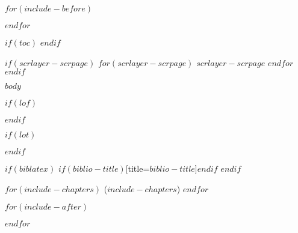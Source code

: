 \documentclass[$if(fontsize)$$fontsize$,$endif$$if(lang)$$lang$,$endif$$if(papersize)$$papersize$,$endif$$for(classoption)$$classoption$$sep$,$endfor$]{$documentclass$}
\begin{document}
\frontmatter

$for(include-before)$
  
$endfor$

\clearpage

$if(toc)$
  \renewcommand*\contentsname{Inhaltsverzeichnis}
  \hypersetup{linkcolor=black}
  \setcounter{tocdepth}{$toc-depth$}
  \tableofcontents
  \pagestyle{empty}
  \cleardoublepage
  \restoregeometry
$endif$

$if(scrlayer-scrpage)$
  $for(scrlayer-scrpage)$
    $scrlayer-scrpage$
  $endfor$
$endif$

\mainmatter

$body$


$if(lof)$
  \renewcommand*\listfigurename{Abbildungsverzeichnis}
    \listoffigures
  \restoregeometry
$endif$

$if(lot)$
  \renewcommand*\listtablename{Tabellenverzeichnis}
    \listoftables
  \restoregeometry
$endif$

\renewcommand*{\lstlistlistingname}{Sourcecodeverzeichnis}
  \lstlistoflistings
\restoregeometry
\clearpage

$if(biblatex)$
  \printbibliography$if(biblio-title)$[title=$biblio-title$]$endif$
$endif$

$for(include-chapters)$
  ($include-chapters$)
$endfor$

\backmatter

$for(include-after)$
  
$endfor$
\end{document}
